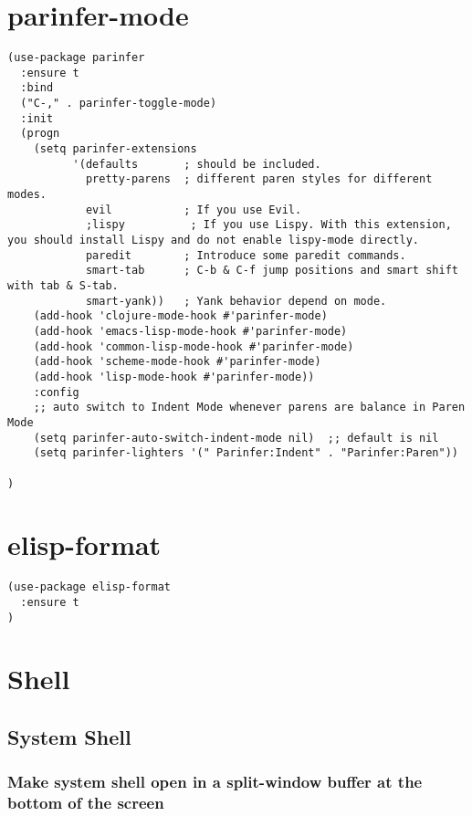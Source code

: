 \documentclass[11pt]{article}
\begin{document}
\section*{parinfer-mode}
\label{sec:org67cb31d}

\begin{verbatim}
(use-package parinfer
  :ensure t
  :bind
  ("C-," . parinfer-toggle-mode)
  :init
  (progn
    (setq parinfer-extensions
          '(defaults       ; should be included.
            pretty-parens  ; different paren styles for different modes.
            evil           ; If you use Evil.
            ;lispy          ; If you use Lispy. With this extension, you should install Lispy and do not enable lispy-mode directly.
            paredit        ; Introduce some paredit commands.
            smart-tab      ; C-b & C-f jump positions and smart shift with tab & S-tab.
            smart-yank))   ; Yank behavior depend on mode.
    (add-hook 'clojure-mode-hook #'parinfer-mode)
    (add-hook 'emacs-lisp-mode-hook #'parinfer-mode)
    (add-hook 'common-lisp-mode-hook #'parinfer-mode)
    (add-hook 'scheme-mode-hook #'parinfer-mode)
    (add-hook 'lisp-mode-hook #'parinfer-mode))
    :config
    ;; auto switch to Indent Mode whenever parens are balance in Paren Mode
    (setq parinfer-auto-switch-indent-mode nil)  ;; default is nil
    (setq parinfer-lighters '(" Parinfer:Indent" . "Parinfer:Paren"))

)
\end{verbatim}

\section*{elisp-format}
\label{sec:org4bbee9e}

\begin{verbatim}
(use-package elisp-format
  :ensure t
)
\end{verbatim}


\section*{Shell}
\label{sec:org9390862}

\subsection*{System Shell}
\label{sec:orgb44a819}
\subsubsection*{Make system shell open in a split-window buffer at the bottom of the screen}
\label{sec:org4becafd}
\end{document}
